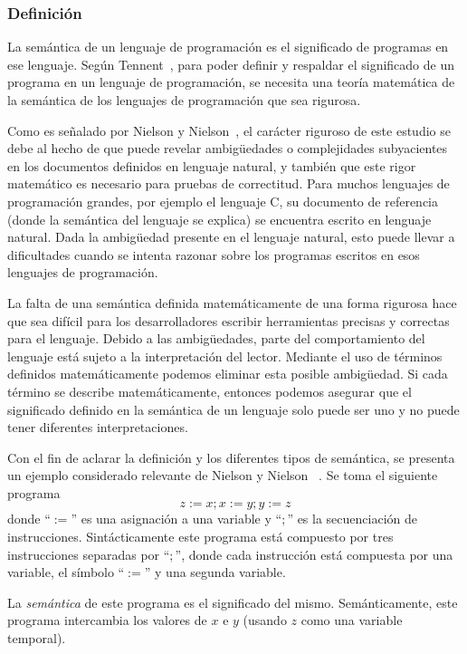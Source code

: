 \subsubsection*{Definición}

La semántica de un lenguaje de programación es el significado de programas en ese lenguaje.
Según Tennent~\cite{tennent}, para poder definir y respaldar el significado de un programa en un lenguaje de programación, se necesita una teoría matemática de la semántica de los lenguajes de programación que sea rigurosa.

Como es señalado por Nielson y Nielson~\cite{nielson}, el carácter riguroso de este estudio se debe al hecho de que puede revelar ambigüedades o complejidades subyacientes en los documentos definidos en lenguaje natural, y también que este rigor matemático es necesario para pruebas de correctitud.
Para muchos lenguajes de programación grandes, por ejemplo el lenguaje C, su documento de referencia (donde la semántica del lenguaje se explica) se encuentra escrito en lenguaje natural.
Dada la ambigüedad presente en el lenguaje natural, esto puede llevar a dificultades cuando se intenta razonar sobre los programas escritos en esos lenguajes de programación.

La falta de una semántica definida matemáticamente de una forma rigurosa hace que sea difícil para los desarrolladores escribir herramientas precisas y correctas para el lenguaje.
Debido a las ambigüedades, parte del comportamiento del lenguaje está sujeto a la interpretación del lector.
Mediante el uso de términos definidos matemáticamente podemos eliminar esta posible ambigüedad.
Si cada término se describe matemáticamente, entonces podemos asegurar que el significado definido en la semántica de un lenguaje solo puede ser uno y no puede tener diferentes interpretaciones.

Con el fin de aclarar la definición y los diferentes tipos de semántica, se presenta un ejemplo considerado relevante de Nielson y Nielson ~\cite{nielson}.
Se toma el siguiente programa
\begin{equation*}
z:=x; x:=y; y:=z
\end{equation*}
donde ``$:=$'' es una asignación a una variable y ``$;$'' es la secuenciación de instrucciones.
Sintácticamente este programa está compuesto por tres instrucciones separadas por ``$;$'', donde cada instrucción está compuesta por una variable, el símbolo ``$:=$'' y una segunda variable.

La \textit{semántica} de este programa es el significado del mismo.
Semánticamente, este programa intercambia los valores de $x$ e $y$ (usando $z$ como una variable temporal).


